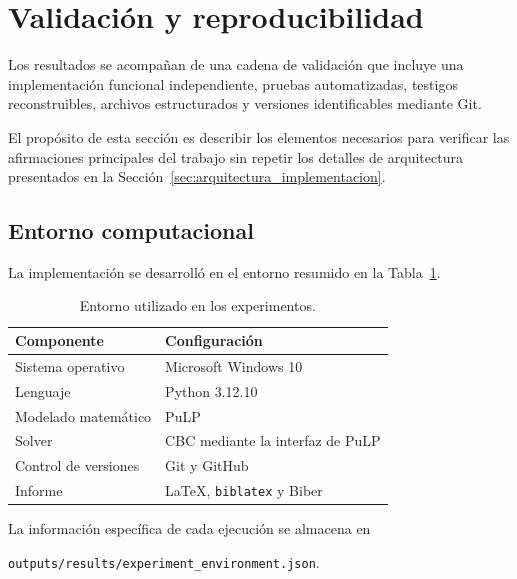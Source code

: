﻿\section{Validación y reproducibilidad}
\label{sec:reproducibilidad}

Los resultados se acompañan de una cadena de validación que incluye una
implementación funcional independiente, pruebas automatizadas, testigos
reconstruibles, archivos estructurados y versiones identificables mediante
Git.

El propósito de esta sección es describir los elementos necesarios para
verificar las afirmaciones principales del trabajo sin repetir los detalles
de arquitectura presentados en la
Sección~\ref{sec:arquitectura_implementacion}.


\subsection{Entorno computacional}
\label{subsec:entorno_computacional}

La implementación se desarrolló en el entorno resumido en la
Tabla~\ref{tab:entorno_computacional}.

\begin{table}[htbp]
    \centering
    \caption{Entorno utilizado en los experimentos.}
    \label{tab:entorno_computacional}
    \begin{tabular}{p{}p{}}
        \hline
        \textbf{Componente} & \textbf{Configuración} \\
        \hline
        Sistema operativo & Microsoft Windows 10 \\
        Lenguaje & Python 3.12.10 \\
        Modelado matemático & PuLP \\
        Solver & CBC mediante la interfaz de PuLP \\
        Control de versiones & Git y GitHub \\
        Informe & \LaTeX, \texttt{biblatex} y Biber \\
        \hline
    \end{tabular}
\end{table}

La información específica de cada ejecución se almacena en

\begin{center}
\texttt{outputs/results/experiment\_environment.json}.
\end{center}

